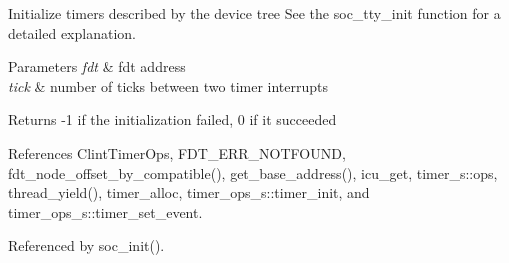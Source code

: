Initialize timers described by the device tree See the soc\-\_\-tty\-\_\-init function for a detailed explanation. 


\begin{DoxyParams}{Parameters}
{\em fdt} & fdt address \\
\hline
{\em tick} & number of ticks between two timer interrupts \\
\hline
\end{DoxyParams}
\begin{DoxyReturn}{Returns}
-\/1 if the initialization failed, 0 if it succeeded 
\end{DoxyReturn}


References Clint\-Timer\-Ops, F\-D\-T\-\_\-\-E\-R\-R\-\_\-\-N\-O\-T\-F\-O\-U\-N\-D, fdt\-\_\-node\-\_\-offset\-\_\-by\-\_\-compatible(), get\-\_\-base\-\_\-address(), icu\-\_\-get, timer\-\_\-s\-::ops, thread\-\_\-yield(), timer\-\_\-alloc, timer\-\_\-ops\-\_\-s\-::timer\-\_\-init, and timer\-\_\-ops\-\_\-s\-::timer\-\_\-set\-\_\-event.



Referenced by soc\-\_\-init().


